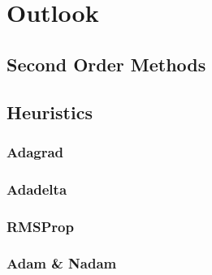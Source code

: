 \chapter{Outlook}

\section{Second Order Methods}

\section{Heuristics}

\subsection{Adagrad}

\subsection{Adadelta}

\subsection{RMSProp}
\subsection{Adam \& Nadam}


\endinput
